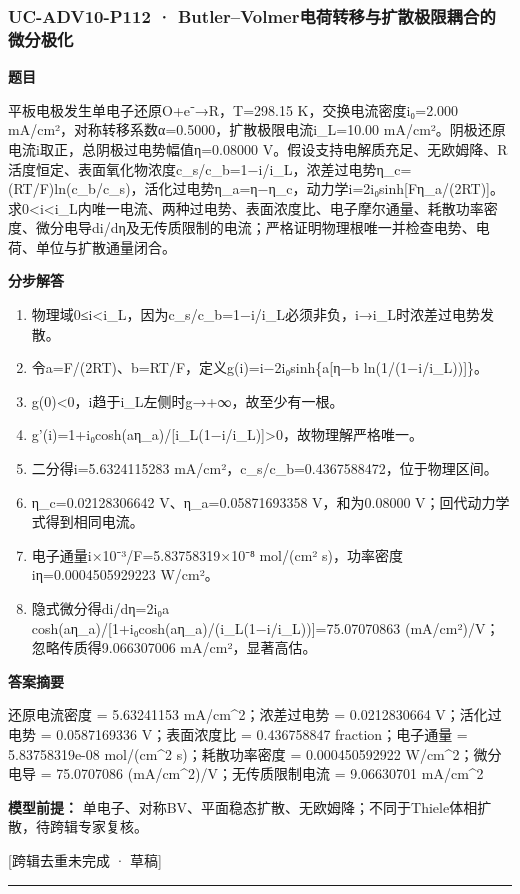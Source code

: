 \documentclass[UTF8,11pt,a4paper]{ctexart}
\begin{document}
\subsubsection*{UC-ADV10-P112 · Butler–Volmer电荷转移与扩散极限耦合的微分极化}
\noindent\textbf{题目}\par
平板电极发生单电子还原O+e⁻→R，T=298.15 K，交换电流密度i₀=2.000 mA/cm²，对称转移系数α=0.5000，扩散极限电流i\_L=10.00 mA/cm²。阴极还原电流i取正，总阴极过电势幅值η=0.08000 V。假设支持电解质充足、无欧姆降、R活度恒定、表面氧化物浓度c\_s/c\_b=1−i/i\_L，浓差过电势η\_c=(RT/F)ln(c\_b/c\_s)，活化过电势η\_a=η−η\_c，动力学i=2i₀sinh[Fη\_a/(2RT)]。求0<i<i\_L内唯一电流、两种过电势、表面浓度比、电子摩尔通量、耗散功率密度、微分电导di/dη及无传质限制的电流；严格证明物理根唯一并检查电势、电荷、单位与扩散通量闭合。\par
\medskip\noindent\textbf{分步解答}
\begin{enumerate}
\item 物理域0≤i<i\_L，因为c\_s/c\_b=1−i/i\_L必须非负，i→i\_L时浓差过电势发散。
\item 令a=F/(2RT)、b=RT/F，定义g(i)=i−2i₀sinh\{a[η−b ln(1/(1−i/i\_L))]\}。
\item g(0)<0，i趋于i\_L左侧时g→+∞，故至少有一根。
\item g'(i)=1+i₀cosh(aη\_a)/[i\_L(1−i/i\_L)]>0，故物理解严格唯一。
\item 二分得i=5.6324115283 mA/cm²，c\_s/c\_b=0.4367588472，位于物理区间。
\item η\_c=0.02128306642 V、η\_a=0.05871693358 V，和为0.08000 V；回代动力学式得到相同电流。
\item 电子通量i×10⁻³/F=5.83758319×10⁻⁸ mol/(cm² s)，功率密度iη=0.0004505929223 W/cm²。
\item 隐式微分得di/dη=2i₀a cosh(aη\_a)/[1+i₀cosh(aη\_a)/(i\_L(1−i/i\_L))]=75.07070863 (mA/cm²)/V；忽略传质得9.066307006 mA/cm²，显著高估。
\end{enumerate}
\noindent\textbf{答案摘要}\par
还原电流密度 = 5.63241153 mA/cm\textasciicircum{}2；浓差过电势 = 0.0212830664 V；活化过电势 = 0.0587169336 V；表面浓度比 = 0.436758847 fraction；电子通量 = 5.83758319e-08 mol/(cm\textasciicircum{}2 s)；耗散功率密度 = 0.000450592922 W/cm\textasciicircum{}2；微分电导 = 75.0707086 (mA/cm\textasciicircum{}2)/V；无传质限制电流 = 9.06630701 mA/cm\textasciicircum{}2\par
\noindent\textbf{模型前提：}
单电子、对称BV、平面稳态扩散、无欧姆降；不同于Thiele体相扩散，待跨辑专家复核。\par
\noindent\textcolor{red!65!black}{[跨辑去重未完成 · 草稿]} \par
\medskip\hrule\medskip
{}
\end{document}
